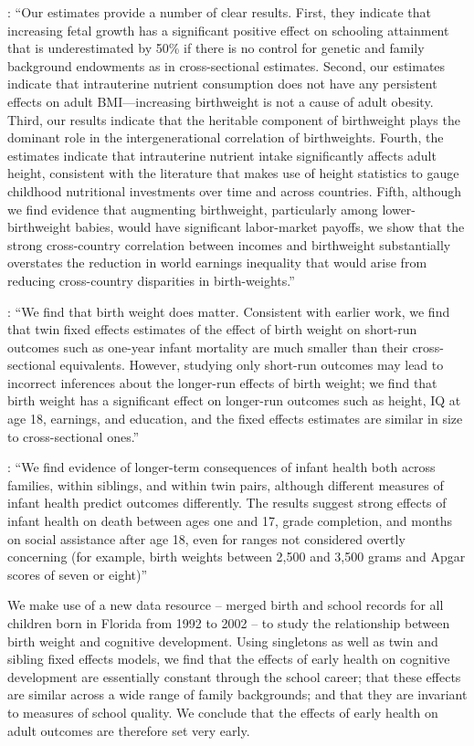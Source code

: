 \documentclass[a4paper, 11pt]{article}
\begin{document}
\begin{spacing}{1.4}
\citet{BehrmanRosenzweig2004}: ``Our estimates provide a number of clear results. First,
they indicate that increasing fetal growth has a significant positive effect on schooling
attainment that is underestimated by 50\% if there is no control for genetic and family
background endowments as in cross-sectional estimates.
Second, our estimates indicate that intrauterine nutrient
consumption does not have any persistent effects on adult
BMI---increasing birthweight is not a cause of adult obesity.
Third, our results indicate that the heritable component of
birthweight plays the dominant role in the intergenerational
correlation of birthweights. Fourth, the estimates indicate
that intrauterine nutrient intake significantly affects adult
height, consistent with the literature that makes use of
height statistics to gauge childhood nutritional investments
over time and across countries. Fifth, although we
find evidence that augmenting birthweight, particularly
among lower-birthweight babies, would have significant
labor-market payoffs, we show that the strong cross-country
correlation between incomes and birthweight substantially
overstates the reduction in world earnings inequality that
would arise from reducing cross-country disparities in birth-weights.''

\citet{Blacketal2007}: ``We find that birth weight does matter. Consistent with earlier
work, we find that twin fixed effects estimates of the effect of birth weight on
short-run outcomes such as one-year infant mortality are much smaller than their
cross-sectional equivalents. However, studying only short-run outcomes may lead to
incorrect inferences about the longer-run effects of birth weight; we find
that birth weight has a significant effect on longer-run outcomes
such as height, IQ at age 18, earnings, and education,
and the fixed effects estimates are similar in size to cross-sectional ones.''

\citet{Oreopoulosetal2008}: ``We find evidence of longer-term
consequences of infant health both across families, within siblings, and
within twin pairs, although different measures of infant health predict outcomes
differently. The
results suggest strong effects of infant health on death between ages one and 17,
grade completion, and months on social assistance after age 18, even for ranges
not considered overtly concerning (for example, birth weights between 2,500 and
3,500 grams and Apgar scores of seven or eight)''

\citet{Figlioetal2014} We make use of a new data resource -- merged birth and school records for all children born in Florida from 1992 to 2002 -- to study the relationship between birth weight and cognitive development. Using singletons as well as twin and sibling fixed effects models, we find that the effects of early health on cognitive development are essentially constant through the school career; that these effects are similar across a wide range of family backgrounds; and that they are invariant to measures of school quality. We conclude that the effects of early health on adult outcomes are therefore set very early. 


\end{spacing}
\end{document}
